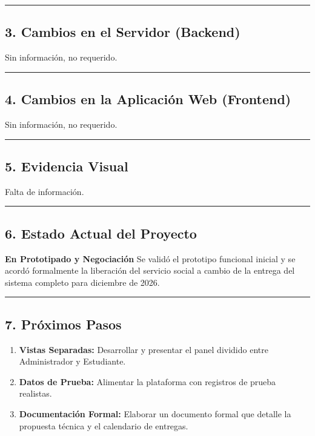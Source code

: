 \documentclass[
]{article}
\providecommand{\tightlist}{%
  \setlength{\itemsep}{0pt}\setlength{\parskip}{0pt}}
\begin{document}
\begin{center}\rule{0.5\linewidth}{0.5pt}\end{center}

\subsection{3. Cambios en el Servidor
(Backend)}\label{cambios-en-el-servidor-backend}

Sin información, no requerido.

\begin{center}\rule{0.5\linewidth}{0.5pt}\end{center}

\subsection{4. Cambios en la Aplicación Web
(Frontend)}\label{cambios-en-la-aplicaciuxf3n-web-frontend}

Sin información, no requerido.

\begin{center}\rule{0.5\linewidth}{0.5pt}\end{center}

\subsection{5. Evidencia Visual}\label{evidencia-visual}

Falta de información.

\begin{center}\rule{0.5\linewidth}{0.5pt}\end{center}

\subsection{6. Estado Actual del
Proyecto}\label{estado-actual-del-proyecto}

\textbf{En Prototipado y Negociación} Se validó el prototipo funcional
inicial y se acordó formalmente la liberación del servicio social a
cambio de la entrega del sistema completo para diciembre de 2026.

\begin{center}\rule{0.5\linewidth}{0.5pt}\end{center}

\subsection{7. Próximos Pasos}\label{pruxf3ximos-pasos}

\begin{enumerate}
\def\labelenumi{\arabic{enumi}.}
\tightlist
\item
  \textbf{Vistas Separadas:} Desarrollar y presentar el panel dividido
  entre Administrador y Estudiante.
\item
  \textbf{Datos de Prueba:} Alimentar la plataforma con registros de
  prueba realistas.
\item
  \textbf{Documentación Formal:} Elaborar un documento formal que
  detalle la propuesta técnica y el calendario de entregas.
\end{enumerate}
\end{document}
